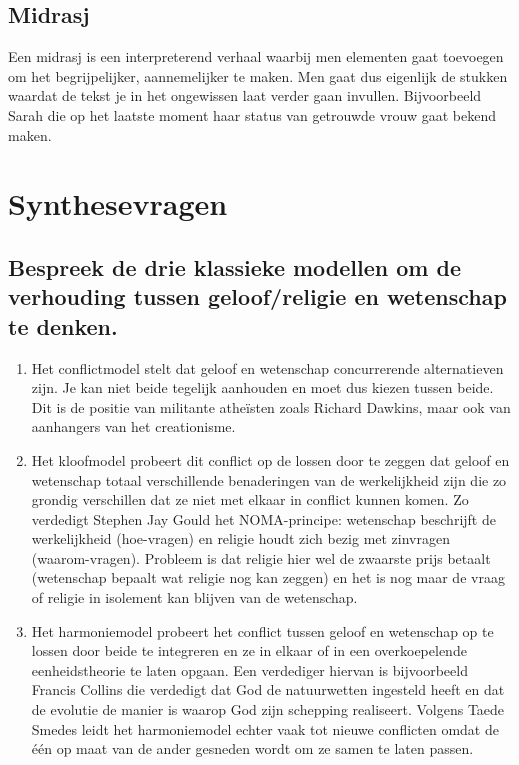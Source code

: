 \documentclass[11pt,a4paper,titlepage]{article}
\begin{document}
\subsection{Midrasj}
Een midrasj is een interpreterend verhaal waarbij men elementen gaat toevoegen om het begrijpelijker, aannemelijker te maken. Men gaat dus eigenlijk de stukken waardat de tekst je in het ongewissen laat verder gaan invullen. Bijvoorbeeld Sarah die op het laatste moment haar status van getrouwde vrouw gaat bekend maken.


\section{Synthesevragen}

\subsection{Bespreek de drie klassieke modellen om de verhouding tussen geloof/religie en wetenschap te denken. }
\begin{enumerate}
\item Het conflictmodel stelt dat geloof en wetenschap concurrerende
alternatieven zijn. Je kan niet beide tegelijk aanhouden en moet dus
kiezen tussen beide. Dit is de positie van militante atheïsten zoals
Richard Dawkins, maar ook van aanhangers van het creationisme.
\item Het kloofmodel probeert dit conflict op de lossen door te zeggen dat
geloof en wetenschap totaal verschillende benaderingen van de
werkelijkheid zijn die zo grondig verschillen dat ze niet met elkaar in
conflict kunnen komen. Zo verdedigt Stephen Jay Gould het NOMA-principe:
wetenschap beschrijft de werkelijkheid (hoe-vragen) en religie
houdt zich bezig met zinvragen (waarom-vragen). Probleem is dat
religie hier wel de zwaarste prijs betaalt (wetenschap bepaalt wat
religie nog kan zeggen) en het is nog maar de vraag of religie in
isolement kan blijven van de wetenschap.
\item Het harmoniemodel probeert het conflict tussen geloof en wetenschap op te lossen door beide te integreren en ze in elkaar of in een overkoepelende eenheidstheorie te laten opgaan. Een verdediger hiervan is bijvoorbeeld Francis Collins die verdedigt dat God de natuurwetten ingesteld heeft en dat de evolutie de manier is waarop God zijn schepping realiseert. Volgens Taede Smedes leidt het harmoniemodel echter vaak tot nieuwe conflicten omdat de één op maat van de ander gesneden wordt om ze samen te laten passen.
\end{enumerate}
\end{document}
